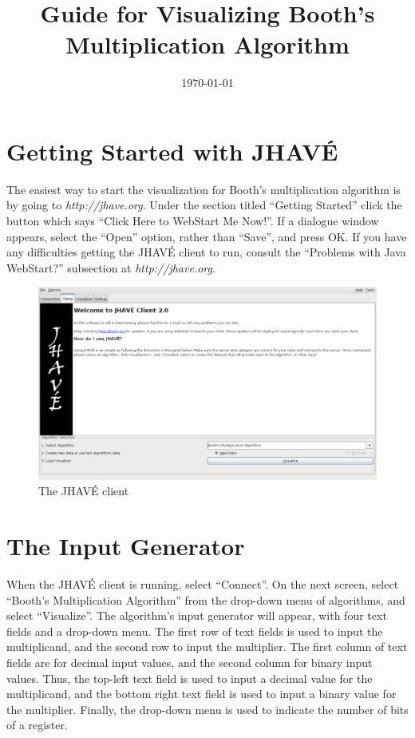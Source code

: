 \documentclass{article}
\title{Guide for Visualizing Booth's Multiplication Algorithm}
\date{\today}
\begin{document}
\section{Getting Started with JHAVÉ}
The easiest way to start the visualization for Booth's multiplication algorithm is by going to \emph{http://jhave.org}.
Under the section titled ``Getting Started'' click the button which says ``Click Here to WebStart Me Now!''.
If a dialogue window appears, select the ``Open'' option, rather than ``Save'', and press OK.
If you have any difficulties getting the JHAVÉ client to run, consult the ``Problems with Java WebStart?'' subsection at \emph{http://jhave.org}.

\begin{figure}[h]
\centering
\includegraphics[scale=0.3]{start.pdf}
\caption{The JHAVÉ client}
\end{figure}

\section{The Input Generator}

When the JHAVÉ client is running, select ``Connect''.
On the next screen, select ``Booth's Multiplication Algorithm'' from the drop-down menu of algorithms, and select ``Visualize''.
The algorithm's input generator will appear, with four text fields and a drop-down menu.
The first row of text fields is used to input the multiplicand, and the second row to input the multiplier.
The first column of text fields are for decimal input values, and the second column for binary input values.
Thus, the top-left text field is used to input a decimal value for the multiplicand, and the bottom right text field is used to input a binary value for the multiplier.
Finally, the drop-down menu is used to indicate the number of bits of a register.
\end{document}
